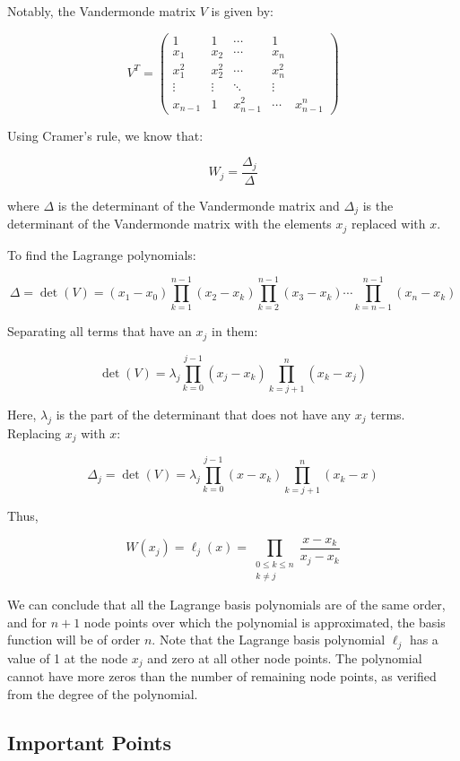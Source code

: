 \documentclass[12pt]{report} %
\begin{document}
Notably, the Vandermonde matrix \( V \) is given by:

\[
V^T =
\begin{pmatrix}
1 & 1 & \cdots & 1 \\
x_1 & x_2 & \cdots & x_n \\
x_1^2 & x_2^2 & \cdots & x_n^2 \\
\vdots & \vdots & \ddots & \vdots \\
x_{n-1} & 1 & x_{n-1}^2 & \cdots & x_{n-1}^n
\end{pmatrix}
\]

Using Cramer’s rule, we know that:

\[
W_j = \frac{\Delta_j}{\Delta}
\]

where \( \Delta \) is the determinant of the Vandermonde matrix and \( \Delta_j \) is the determinant of the Vandermonde matrix with the elements \( x_j \) replaced with \( x \).

To find the Lagrange polynomials:

\[
\Delta = \det(V) = (x_1 - x_0) \prod_{k=1}^{n-1} (x_2 - x_k) \prod_{k=2}^{n-1} (x_3 - x_k) \cdots \prod_{k=n-1}^{n-1} (x_n - x_k)
\]

Separating all terms that have an \( x_j \) in them:

\[
\det(V) = \lambda_j \prod_{k=0}^{j-1} (x_j - x_k) \prod_{k=j+1}^{n} (x_k - x_j)
\]

Here, \( \lambda_j \) is the part of the determinant that does not have any \( x_j \) terms. Replacing \( x_j \) with \( x \):

\[
\Delta_j = \det(V) = \lambda_j \prod_{k=0}^{j-1} (x - x_k) \prod_{k=j+1}^{n} (x_k - x)
\]

Thus,

\[
W(x_j) = \ell_j(x) = \prod_{\substack{0 \leq k \leq n \\ k \neq j}} \frac{x - x_k}{x_j - x_k}
\]

We can conclude that all the Lagrange basis polynomials are of the same order, and for \( n + 1 \) node points over which the polynomial is approximated, the basis function will be of order \( n \). Note that the Lagrange basis polynomial \( \ell_j \) has a value of 1 at the node \( x_j \) and zero at all other node points. The polynomial cannot have more zeros than the number of remaining node points, as verified from the degree of the polynomial.

\subsection{Important Points}
\end{document}
